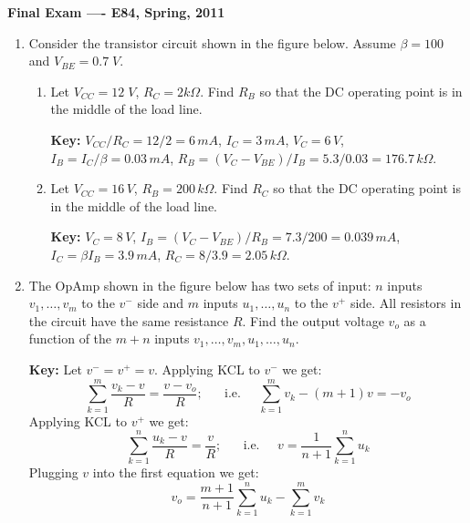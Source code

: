 \usepackage{html}

\begin{center}
{\Large \bf  Final Exam ---- E84, Spring, 2011}
\end{center}

\begin{enumerate}
\item Consider the transistor circuit shown in the figure below.
  Assume $\beta=100$ and $V_{BE}=0.7\;V$. 


  \begin{enumerate}
  \item Let $V_{CC}=12\;V$, $R_C=2k\Omega$. Find $R_B$ so that the DC
    operating point is in the middle of the load line.

    {\bf Key:} $V_{CC}/R_C=12/2=6\,mA$, $I_C=3\,mA$, $V_C=6\,V$,
    $I_B=I_C/\beta=0.03\,mA$, $R_B=(V_C-V_{BE})/I_B=5.3/0.03=176.7\,k\Omega$.
  \item Let $V_{CC}=16\,V$, $R_B=200\,k\Omega$. Find $R_C$ so that the
    DC operating point is in the middle of the load line.

    {\bf Key:} $V_C=8\,V$, $I_B=(V_C-V_{BE})/R_B=7.3/200=0.039\,mA$,
    $I_C=\beta I_B=3.9\,mA$, $R_C=8/3.9=2.05\,k\Omega$.

  \end{enumerate}

\item The OpAmp shown in the figure below has two sets of input:
  $n$ inputs $v_1,\ldots,v_m$ to the $v^-$ side and $m$ inputs $u_1,\ldots,u_n$
  to the $v^+$ side. All resistors in the circuit have the same resistance $R$.
  Find the output voltage $v_o$ as a function of the $m+n$ inputs 
  $v_1,\ldots,v_m,u_1,\ldots,u_n$. 


  {\bf Key:} Let $v^-=v^+=v$. Applying KCL to $v^-$ we get:
  \[ \sum_{k=1}^m \frac{v_k-v}{R}=\frac{v-v_o}{R};\;\;\;\;\;\;\mbox{i.e.}\;\;\;\;\;
  \sum_{k=1}^m v_k-(m+1) v=-v_o \]
  Applying KCL to $v^+$ we get:
  \[ \sum_{k=1}^n \frac{u_k-v}{R}=\frac{v}{R};\;\;\;\;\;\;\mbox{i.e.}\;\;\;\;\;
  v=\frac{1}{n+1} \sum_{k=1}^n u_k \]
  Plugging $v$ into the first equation we get:
  \[ v_o=\frac{m+1}{n+1} \sum_{k=1}^n u_k-\sum_{k=1}^m v_k  \]

\end{enumerate}



